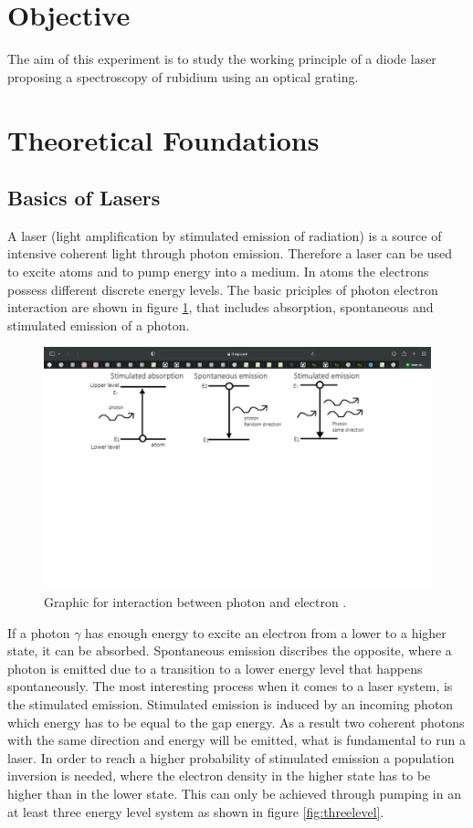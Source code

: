 \section{Objective}
The aim of this experiment is to study the working principle of a diode laser proposing a spectroscopy of rubidium using an optical grating.


\section{Theoretical Foundations}
\subsection{Basics of Lasers}

\noindent
A laser (light amplification by stimulated emission of radiation) is a source of intensive coherent light through photon emission.
Therefore a laser can be used to excite atoms and to pump energy into a medium.
In atoms the electrons possess different discrete energy levels.
The basic priciples of photon electron interaction are shown in figure \ref{fig:emission},
that includes absorption, spontaneous and stimulated emission of a photon.


\begin{figure}
  \centering
  \includegraphics[width=\textwidth]{emission.pdf}
  \caption{Graphic for interaction between photon and electron \cite{emissiongraphic}.}
  \label{fig:emission}
\end{figure}

\noindent
If a photon $\gamma$ has enough energy to excite an electron from a lower to a higher state, it can be absorbed.
Spontaneous emission discribes the opposite, where a photon is emitted due to a transition to a lower energy level that happens spontaneously.
The  most interesting process when it comes to a laser system, is the stimulated emission.
Stimulated emission is induced by an incoming photon which energy has to be equal to the gap energy.
As a result two coherent photons with the same direction and energy will be emitted, what is fundamental to run a laser.
In order to reach a higher probability of stimulated emission a population inversion is needed, where the electron density in the higher state has to be higher than in the lower state.
This can only be achieved through pumping in an at least three energy level system as shown in figure \ref{fig:threelevel}.

